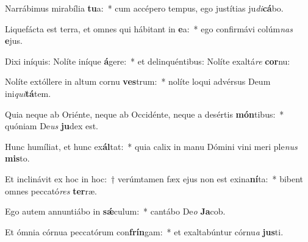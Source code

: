 \item Narrábimus mirabília \textbf{tu}a:~* cum accépero tempus, ego justítias ju\textit{di}\textbf{cá}bo.
\item Liquefácta est terra, et omnes qui hábitant in \textbf{e}a:~* ego confirmávi colúm\textit{nas} \textbf{e}jus.
\item Dixi iníquis: Nolíte iníque \textbf{á}gere:~* et delinquéntibus: Nolíte exaltá\textit{re} \textbf{cor}nu:
\item Nolíte extóllere in altum cornu \textbf{ves}trum:~* nolíte loqui advérsus Deum ini\textit{qui}\textbf{tá}tem.
\item Quia neque ab Oriénte, neque ab Occidénte, neque a desértis \textbf{món}tibus:~* quóniam De\textit{us} \textbf{ju}dex est.
\item Hunc humíliat, et hunc ex\textbf{ál}tat:~* quia calix in manu Dómini vini meri ple\textit{nus} \textbf{mis}to.
\item Et inclinávit ex hoc in hoc:~† verúmtamen fæx ejus non est exina\textbf{ní}ta:~* bibent omnes peccató\textit{res} \textbf{ter}ræ.
\item Ego autem annuntiábo in \textbf{sǽ}culum:~* cantábo De\textit{o} \textbf{Ja}cob.
\item Et ómnia córnua peccatórum con\textbf{frín}gam:~* et exaltabúntur córnu\textit{a} \textbf{jus}ti.

